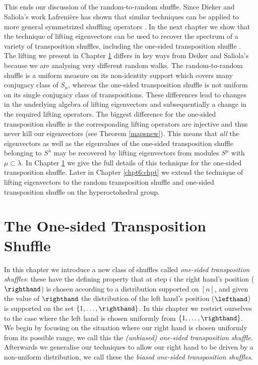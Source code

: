 \documentclass[11pt]{report}
\begin{document}
\paragraph{}	
This ends our discussion of the random-to-random shuffle.  Since Dieker and 
Saliola's work Lafreni{\`e}re has shown that similar techniques can be applied to more general symmetrized shuffling operators \cite{Lafreni2018}. In the next chapter we show that the technique of lifting eigenvectors can be used to recover the spectrum of a variety of transposition shuffles, including the one-sided transposition shuffle . The lifting we present in Chapter \ref{chpt5:chpt} differs in key ways from Deiker and Saliola's \cite{dieker2018spectral} because we are analysing very different random walks. The random-to-random shuffle is a uniform measure on its non-identity support which covers many conjugacy class of $S_{n}$, whereas the one-sided transposition shuffle is not uniform on its single conjugacy class of transpositions.
These differences lead to changes in the underlying algebra of lifting eigenvectors and subsequentially a change in the required lifting operators. The biggest difference for the one-sided transposition shuffle is the corresponding lifting operators are injective and thus never kill our eigenvectors (see Theorem \ref{mapsnew}). This means that \emph{all} the eigenvectors as well as the eigenvalues of the one-sided transposition shuffle belonging to $S^{\lambda}$ may be recovered by lifting eigenvectors from modules $S^{\mu}$ with $\mu \subset \lambda$. In Chapter \ref{chpt5:chpt} we give the full details of this technique for the one-sided transposition shuffle.  Later in Chapter \ref{chpt6:chpt} we extend the technique of lifting eigenvectors to the random transposition shuffle and one-sided transposition shuffle on the hyperoctohedral group.





	\chapter{The One-sided Transposition Shuffle}
\label{chpt5:chpt}





In this chapter we introduce a new class of shuffles called 
\emph{one-sided transposition shuffles}: these have the defining property 
that at step $i$ the right hand's position ($\righthand$) is chosen 
according to a distribution supported on $[n]$, and given the value of 
$\righthand$ the distribution of the left hand's position ($\lefthand$) is supported on the set $\{1,\dots,\righthand\}$. In this chapter we 	restrict ourselves to the case where the left hand is chosen uniformly from $\{1,\ldots,\righthand\}$. We begin by focusing on the situation where our right hand is chosen uniformly from its possible range, we  call this the \emph{(unbiased) one-sided transposition shuffle}. Afterwards we generalise our techniques  to allow our right hand to be driven by a non-uniform distribution, we call these the \emph{biased one-sided transposition shuffles}.
\end{document}
